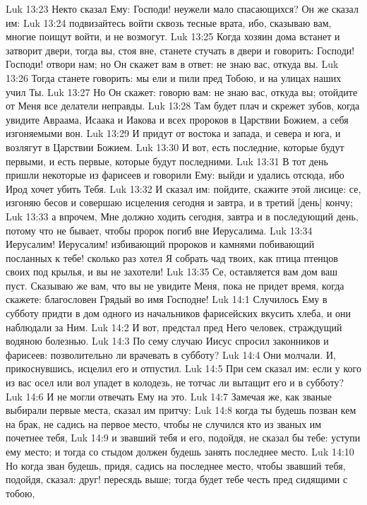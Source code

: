 Luk 13:23  Некто сказал Ему: Господи! неужели мало спасающихся? Он же сказал им:
Luk 13:24  подвизайтесь войти сквозь тесные врата, ибо, сказываю вам, многие поищут войти, и не возмогут.
Luk 13:25  Когда хозяин дома встанет и затворит двери, тогда вы, стоя вне, станете стучать в двери и говорить: Господи! Господи! отвори нам; но Он скажет вам в ответ: не знаю вас, откуда вы.
Luk 13:26  Тогда станете говорить: мы ели и пили пред Тобою, и на улицах наших учил Ты.
Luk 13:27  Но Он скажет: говорю вам: не знаю вас, откуда вы; отойдите от Меня все делатели неправды.
Luk 13:28  Там будет плач и скрежет зубов, когда увидите Авраама, Исаака и Иакова и всех пророков в Царствии Божием, а себя изгоняемыми вон.
Luk 13:29  И придут от востока и запада, и севера и юга, и возлягут в Царствии Божием.
Luk 13:30  И вот, есть последние, которые будут первыми, и есть первые, которые будут последними.
Luk 13:31  В тот день пришли некоторые из фарисеев и говорили Ему: выйди и удались отсюда, ибо Ирод хочет убить Тебя.
Luk 13:32  И сказал им: пойдите, скажите этой лисице: се, изгоняю бесов и совершаю исцеления сегодня и завтра, и в третий [день] кончу;
Luk 13:33  а впрочем, Мне должно ходить сегодня, завтра и в последующий день, потому что не бывает, чтобы пророк погиб вне Иерусалима.
Luk 13:34  Иерусалим! Иерусалим! избивающий пророков и камнями побивающий посланных к тебе! сколько раз хотел Я собрать чад твоих, как птица птенцов своих под крылья, и вы не захотели!
Luk 13:35  Се, оставляется вам дом ваш пуст. Сказываю же вам, что вы не увидите Меня, пока не придет время, когда скажете: благословен Грядый во имя Господне!
Luk 14:1  Случилось Ему в субботу придти в дом одного из начальников фарисейских вкусить хлеба, и они наблюдали за Ним.
Luk 14:2  И вот, предстал пред Него человек, страждущий водяною болезнью.
Luk 14:3  По сему случаю Иисус спросил законников и фарисеев: позволительно ли врачевать в субботу?
Luk 14:4  Они молчали. И, прикоснувшись, исцелил его и отпустил.
Luk 14:5  При сем сказал им: если у кого из вас осел или вол упадет в колодезь, не тотчас ли вытащит его и в субботу?
Luk 14:6  И не могли отвечать Ему на это.
Luk 14:7  Замечая же, как званые выбирали первые места, сказал им притчу:
Luk 14:8  когда ты будешь позван кем на брак, не садись на первое место, чтобы не случился кто из званых им почетнее тебя,
Luk 14:9  и звавший тебя и его, подойдя, не сказал бы тебе: уступи ему место; и тогда со стыдом должен будешь занять последнее место.
Luk 14:10  Но когда зван будешь, придя, садись на последнее место, чтобы звавший тебя, подойдя, сказал: друг! пересядь выше; тогда будет тебе честь пред сидящими с тобою,
